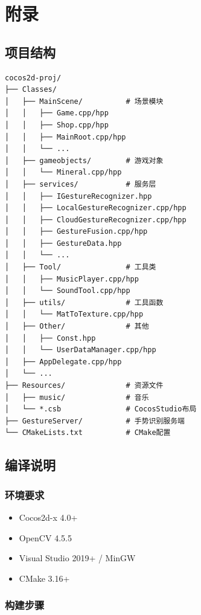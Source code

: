 \documentclass{article}
\begin{document}
\newpage

\section{附录}

\subsection{项目结构}

\begin{lstlisting}[caption=项目目录结构]
cocos2d-proj/
├── Classes/
│   ├── MainScene/          # 场景模块
│   │   ├── Game.cpp/hpp
│   │   ├── Shop.cpp/hpp
│   │   ├── MainRoot.cpp/hpp
│   │   └── ...
│   ├── gameobjects/        # 游戏对象
│   │   └── Mineral.cpp/hpp
│   ├── services/           # 服务层
│   │   ├── IGestureRecognizer.hpp
│   │   ├── LocalGestureRecognizer.cpp/hpp
│   │   ├── CloudGestureRecognizer.cpp/hpp
│   │   ├── GestureFusion.cpp/hpp
│   │   ├── GestureData.hpp
│   │   └── ...
│   ├── Tool/               # 工具类
│   │   ├── MusicPlayer.cpp/hpp
│   │   └── SoundTool.cpp/hpp
│   ├── utils/              # 工具函数
│   │   └── MatToTexture.cpp/hpp
│   ├── Other/              # 其他
│   │   ├── Const.hpp
│   │   └── UserDataManager.cpp/hpp
│   ├── AppDelegate.cpp/hpp
│   └── ...
├── Resources/              # 资源文件
│   ├── music/              # 音乐
│   └── *.csb               # CocosStudio布局
├── GestureServer/          # 手势识别服务端
└── CMakeLists.txt          # CMake配置
\end{lstlisting}

\subsection{编译说明}

\subsubsection{环境要求}

\begin{itemize}[leftmargin=*]
    \item Cocos2d-x 4.0+
    \item OpenCV 4.5.5
    \item Visual Studio 2019+ / MinGW
    \item CMake 3.16+
\end{itemize}

\subsubsection{构建步骤}
\end{document}
